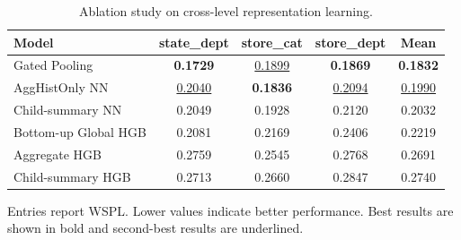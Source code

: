 \begin{table}[H]
\centering
\caption{Ablation study on cross-level representation learning.}
\label{tab:ablation}
\begin{threeparttable}
\begin{tabular}{lcccc}
\toprule
Model & state\_dept & store\_cat & store\_dept & Mean \\
\midrule
Gated Pooling & \textbf{0.1729} & \underline{0.1899} & \textbf{0.1869} & \textbf{0.1832} \\
AggHistOnly NN & \underline{0.2040} & \textbf{0.1836} & \underline{0.2094} & \underline{0.1990} \\
Child-summary NN & 0.2049 & 0.1928 & 0.2120 & 0.2032 \\
Bottom-up Global HGB & 0.2081 & 0.2169 & 0.2406 & 0.2219 \\
Aggregate HGB & 0.2759 & 0.2545 & 0.2768 & 0.2691 \\
Child-summary HGB & 0.2713 & 0.2660 & 0.2847 & 0.2740 \\
\bottomrule
\end{tabular}
\begin{tablenotes}
\footnotesize \item Entries report WSPL. Lower values indicate better performance. Best results are shown in bold and second-best results are underlined.
\end{tablenotes}
\end{threeparttable}
\end{table}
